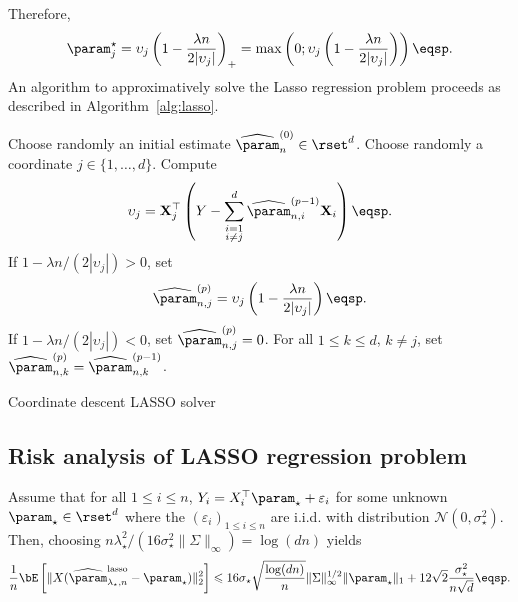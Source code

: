 Therefore,
\[
\param_j^{\star} = \upsilon_j\left( 1 - \frac{\lambda n}{2 |\upsilon_j|}\right)_+ = \mathrm{max}\left(0;\upsilon_j\left( 1 - \frac{\lambda n}{2 |\upsilon_j|}\right)\right)\eqsp.
\]
An algorithm to approximatively solve the Lasso regression problem proceeds as described in Algorithm~\ref{alg:lasso}.
\begin{algorithm}
\centering
\begin{algorithmic}
\State Choose randomly an initial estimate $\widehat \param_n^{(0)}\in\rset^d$.
\State Choose randomly a coordinate $j\in\{1,\ldots, d\}$.
\State Compute
\[
\upsilon_{j}={\bf X}^\top_{j}\left(Y-\sum_{\substack{i=1\\ i\neq j}}^d\widehat\param^{(p-1)}_{n,i}{\bf X}_{i}\right)\eqsp.
\]
\State If $1 - \lambda n/(2 |\upsilon_j|)>0$, set 
\[
\widehat\param^{(p)}_{n,j}= \upsilon_j\left(1 - \frac{\lambda n }{2 |\upsilon_j|}\right)\eqsp.
\]
\State If $1 - \lambda n/(2 |\upsilon_j|)<0$, set $\widehat\param^{(p)}_{n,j}=0$.
\State For all $1\leqslant k \leqslant d$, $k\neq j$, set $\widehat\param^{(p)}_{n,k} = \widehat\param^{(p-1)}_{n,k}$.
\EndFor
\end{algorithmic}
\caption{Coordinate descent LASSO solver}
\label{alg:lasso}
\end{algorithm}

\subsection{Risk analysis of LASSO regression problem}
\begin{proposition}
Assume that for all $1\leqslant i \leqslant n$, $Y_i = X^\top_i \param_{\star} + \varepsilon_i$ for some unknown $\param_\star\in\rset^d$ where the $(\varepsilon_i)_{1\leqslant i\leqslant n}$ are i.i.d. with distribution $\mathcal{N}(0,\sigma_\star^2)$. Then, choosing $n\lambda_\star^2/(16\sigma_\star^2  \|\Sigma\|_\infty) = \log(dn)$ yields
$$
\frac{1}{n}\bE\left[\|X(\widehat\param^{\mathrm{lasso}}_{\lambda_\star,n}-\param_\star)\|_2^2\right] \leqslant  16\sigma_\star\sqrt{\frac{\log(dn)}{n}}\|\Sigma\|_\infty^{1/2}\|\param_\star\|_1  + 12\sqrt{2}\frac{\sigma_\star^2}{n\sqrt{d}} \eqsp.
$$
\end{proposition}

